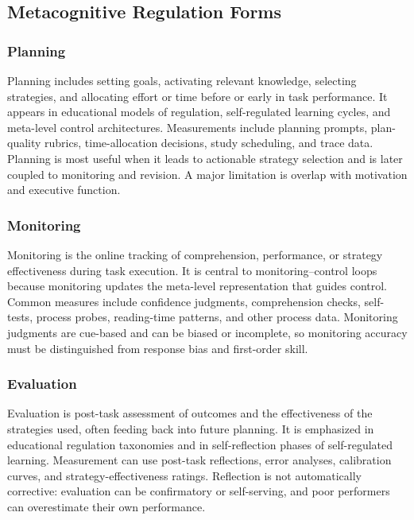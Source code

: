 \documentclass[a4paper]{article}
\begin{document}
   \subsection{Metacognitive Regulation Forms}

   \subsubsection{Planning}

   Planning includes setting goals, activating relevant knowledge, selecting strategies, and allocating effort or time before or early in task performance. It appears in educational models of regulation, self-regulated learning cycles, and meta-level control architectures. Measurements include planning prompts, plan-quality rubrics, time-allocation decisions, study scheduling, and trace data. Planning is most useful when it leads to actionable strategy selection and is later coupled to monitoring and revision. A major limitation is overlap with motivation and executive function.

   \subsubsection{Monitoring}

   Monitoring is the online tracking of comprehension, performance, or strategy effectiveness during task execution. It is central to monitoring--control loops because monitoring updates the meta-level representation that guides control. Common measures include confidence judgments, comprehension checks, self-tests, process probes, reading-time patterns, and other process data. Monitoring judgments are cue-based and can be biased or incomplete, so monitoring accuracy must be distinguished from response bias and first-order skill.

   \subsubsection{Evaluation}

   Evaluation is post-task assessment of outcomes and the effectiveness of the strategies used, often feeding back into future planning. It is emphasized in educational regulation taxonomies and in self-reflection phases of self-regulated learning. Measurement can use post-task reflections, error analyses, calibration curves, and strategy-effectiveness ratings. Reflection is not automatically corrective: evaluation can be confirmatory or self-serving, and poor performers can overestimate their own performance.
\end{document}
